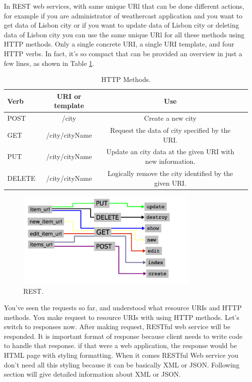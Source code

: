 In REST web services, with same unique URl that can be done different actions, for example if you are administrator of weathercast application and you want to get data of Lisbon city or if you want to update data of Lisbon city or deleting data of Lisbon city you can use the same unique URl for all these methods using HTTP methods. Only a single concrete URI, a single URI template, and four HTTP verbs. In fact, it’s so compact that can be provided an overview in just a few lines, as shown in Table \ref{tab:aeroCoeff}.

\begin{table}[!htb]
  \renewcommand{\arraystretch}{1.2} %
  \centering
  \begin{tabular}{lccc}
    \toprule
    Verb           & URI or template & Use  \\
    \midrule
    POST           & /city & Create a new city\\
    GET            & /city/{cityName} & Request the data of city specified by the URI.\\
    PUT            & /city/{cityName} & Update an city data at the given URI with new information.\\
    DELETE         & /city/{cityName} & Logically remove the city identified by the given URI.\\
    \bottomrule
  \end{tabular}
  \caption[HTTP Methods.]{HTTP Methods.}
  \label{tab:aeroCoeff}
\end{table}

\begin{figure}[!htb]
  \centering
  \includegraphics[width=0.8\textwidth]{Figures/rest.png}
  \caption[REST.]{REST.}
  \label{fig:rest}
\end{figure}

You've seen the requests so far, and understood what resource URIs and HTTP methods. You make request to resource URIs with using HTTP methods. Let's switch to responses now. After making request, RESTful web service will be responded. It is important format of response because client needs to write code to handle that response. if that were a web application, the response would be HTML page with styling formatting. When it comes RESTful Web service you don't need all this styling because it can be basically XML or JSON. Following section will give detailed information about XML or JSON.
